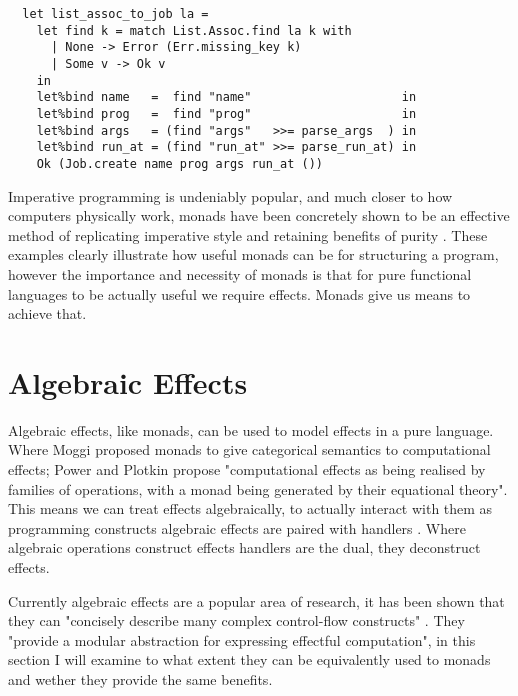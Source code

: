 \documentclass[a4paper,10pt]{article}
\theoremstyle{definition}
\begin{document}
\begin{verbatim}
  let list_assoc_to_job la =
    let find k = match List.Assoc.find la k with
      | None -> Error (Err.missing_key k)
      | Some v -> Ok v
    in
    let%bind name   =  find "name"                     in
    let%bind prog   =  find "prog"                     in
    let%bind args   = (find "args"   >>= parse_args  ) in
    let%bind run_at = (find "run_at" >>= parse_run_at) in
    Ok (Job.create name prog args run_at ())
\end{verbatim}

Imperative programming is undeniably popular, and much closer to how computers physically work,
monads have been concretely shown to be an effective method of replicating
imperative style and retaining benefits of purity \cite{PeytonJones:1993}.
These examples clearly illustrate how useful monads can be for structuring a program,
however the importance and necessity of monads is that for pure functional languages
to be actually useful we require effects. Monads give us means to achieve that.

\section{Algebraic Effects}


Algebraic effects, like monads, can be used to model effects in a pure language.
Where Moggi \cite{moggi1989computational} proposed monads to give categorical semantics to computational effects;
Power and Plotkin \cite{Plotkin:2002dw} propose "computational effects as being realised by
families of operations, with a monad being generated by their equational theory".
This means we can treat effects algebraically,
to actually interact with them as programming constructs algebraic effects are paired with
handlers \cite{plotkin2009handlers}.
Where algebraic operations construct effects handlers are the dual, they deconstruct effects.

Currently algebraic effects are a popular area of research,
it has been shown that they can "concisely describe many complex control-flow constructs" \cite{leijen2017type}.
They "provide a modular abstraction for expressing effectful computation"\cite{dolan2015effective},
in this section I will examine to what extent they can be equivalently used to monads and wether
they provide the same benefits.



\medskip



\end{document}
